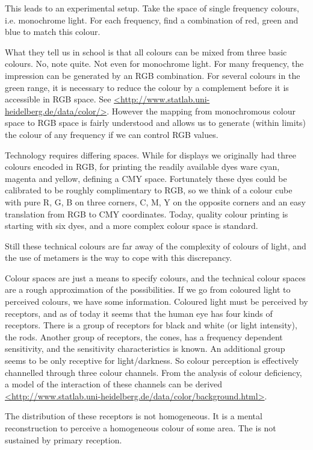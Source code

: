 \documentclass[nogin, dvips,12pt,a4paper,twoside]{amsart}
\begin{document}
This leads to an experimental setup. Take the space of single frequency colours, i.e. monochrome light. For each frequency, find a combination of red, green and blue to match this colour.

What they tell us in school is that all colours can be mixed from three basic colours. No, note quite. Not even for monochrome light. For many frequency, the impression can be generated by an RGB combination. For several colours in the green range, it is necessary to reduce the colour by a complement before it is accessible in RGB space. See \url{<http://www.statlab.uni-heidelberg.de/data/color/>}. However the mapping  from monochromous colour space to RGB space is fairly understood and allows us  to generate (within limits) the colour of any frequency if we can control RGB values.

Technology requires differing spaces. While for displays we originally had three colours encoded in RGB, for printing the readily available dyes ware cyan, magenta and yellow, defining a CMY space. Fortunately these dyes could be calibrated to be roughly complimentary to RGB, so we think of a colour cube with pure R, G, B on three corners, C, M, Y on the opposite corners and an easy translation from RGB to CMY coordinates. Today, quality colour printing is starting with six dyes, and a more complex colour space is standard.

Still these technical colours are far away of the complexity of colours of light, and the use of metamers is the way to cope with this discrepancy.

Colour spaces are just a means to specify colours, and the technical colour spaces are a rough approximation of the possibilities. If we go from coloured light to perceived colours, we have some information. Coloured light must be perceived by receptors, and as of today it seems that the human eye has four kinds of receptors.  There is a group of receptors for black and white (or light intensity), the rods. Another group of receptors, the cones, has a frequency dependent sensitivity, and the sensitivity characteristics is known. An additional group seems to be only receptive for light/darkness. So colour perception is effectively channelled through three colour channels. From the analysis of colour deficiency, a model of the interaction of these channels can be derived  \url{<http://www.statlab.uni-heidelberg.de/data/color/background.html>}. 

The distribution of these receptors is not homogeneous. It is a mental reconstruction to perceive a homogeneous colour of some area. The is not sustained by primary reception.
\end{document}

